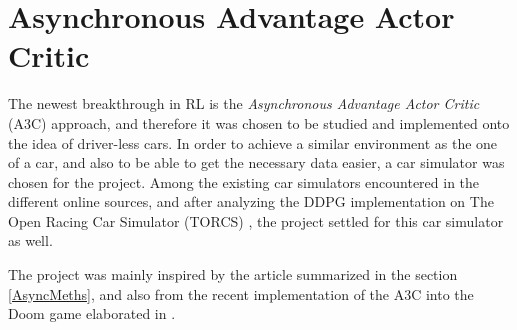 \section{Asynchronous Advantage Actor Critic}
\label{sec:A3C}
The newest breakthrough in RL is the \textit{Asynchronous Advantage Actor Critic} (A3C) approach, and therefore it was chosen to be studied and implemented onto the idea of driver-less cars. In order to achieve a similar environment as the one of a car, and also to be able to get the necessary data easier, a car simulator was chosen for the project. Among the existing car simulators encountered in the different online sources, and after analyzing the DDPG implementation on The Open Racing Car Simulator (TORCS) \cite{DDPG_Torcs}, the project settled for this car simulator as well.

The project was mainly inspired by the article \cite{DBLP:journals/corr/MnihBMGLHSK16} summarized in the section \ref{AsyncMeths}, and also from the recent implementation of the A3C into the Doom game elaborated in \cite{A3CDoom}.


